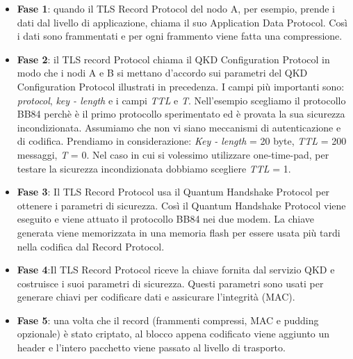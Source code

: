 \begin{itemize}
    \item \textbf{Fase 1}: quando il TLS Record Protocol del nodo A, per esempio, prende i dati dal livello di applicazione, chiama il suo Application Data Protocol. Così i dati sono frammentati e per ogni frammento viene fatta una compressione.
    \item \textbf{Fase 2}: il TLS record Protocol chiama il QKD Configuration Protocol in modo che i nodi A e B si mettano d’accordo sui parametri del QKD Configuration Protocol illustrati in precedenza. I campi più importanti sono: \textit{protocol}, \textit{key - length} e i campi \textit{TTL} e \textit{T}. Nell’esempio scegliamo il protocollo BB84 perchè è il primo protocollo sperimentato ed è provata la sua sicurezza incondizionata. Assumiamo che non vi siano meccanismi di autenticazione e di codifica. Prendiamo in considerazione: \textit{Key - length} = 20 byte, \textit{TTL} = 200 messaggi, \textit{T} = 0. Nel caso in cui si volessimo utilizzare one-time-pad, per testare la sicurezza incondizionata dobbiamo scegliere \textit{TTL} = 1.
    
    \item \textbf{Fase 3}:  Il TLS Record Protocol usa il Quantum Handshake Protocol per ottenere i parametri di sicurezza. Così il Quantum Handshake Protocol viene eseguito e viene attuato il protocollo BB84 nei due modem. La chiave generata viene memorizzata in una memoria flash per essere usata più tardi nella codifica dal Record Protocol.
    
    \item \textbf{Fase 4}:Il TLS Record Protocol riceve la chiave fornita dal servizio QKD e costruisce i suoi parametri di sicurezza. Questi parametri sono usati per generare chiavi per codificare dati e assicurare l’integrità (MAC).
    
    \item \textbf{Fase 5}: una volta che il record (frammenti compressi, MAC e pudding opzionale) è stato criptato, al blocco appena codificato viene aggiunto un header e l’intero pacchetto viene passato al livello di trasporto.
\end{itemize}







